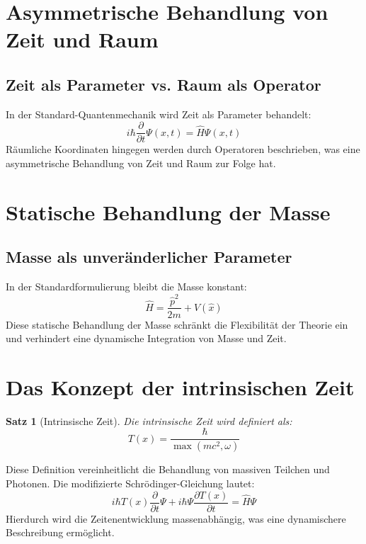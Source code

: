 \documentclass{article}
\newcommand{\Tfield}{T(x)}
\newtheorem{theorem}{Satz}[section]
\begin{document}
	\section{Asymmetrische Behandlung von Zeit und Raum}
	\subsection{Zeit als Parameter vs. Raum als Operator}
	In der Standard-Quantenmechanik wird Zeit als Parameter behandelt:
	\begin{equation}
		i\hbar \frac{\partial}{\partial t}\Psi(x,t) = \hat{H}\Psi(x,t)
	\end{equation}
	Räumliche Koordinaten hingegen werden durch Operatoren beschrieben, was eine asymmetrische Behandlung von Zeit und Raum zur Folge hat.
	
	\section{Statische Behandlung der Masse}
	\subsection{Masse als unveränderlicher Parameter}
	In der Standardformulierung bleibt die Masse konstant:
	\begin{equation}
		\hat{H} = \frac{\hat{p}^2}{2m} + V(\hat{x})
	\end{equation}
	Diese statische Behandlung der Masse schränkt die Flexibilität der Theorie ein und verhindert eine dynamische Integration von Masse und Zeit.
	
	\section{Das Konzept der intrinsischen Zeit}
	\begin{theorem}[Intrinsische Zeit]
		Die intrinsische Zeit wird definiert als:
		\begin{equation}
			\Tfield = \frac{\hbar}{\max(m c^2, \omega)}
		\end{equation}
	\end{theorem}
	Diese Definition vereinheitlicht die Behandlung von massiven Teilchen und Photonen. Die modifizierte Schrödinger-Gleichung lautet:
	\begin{equation}
		i\hbar \Tfield \frac{\partial}{\partial t} \Psi + i\hbar \Psi \frac{\partial \Tfield}{\partial t} = \hat{H} \Psi
	\end{equation}
	Hierdurch wird die Zeitenentwicklung massenabhängig, was eine dynamischere Beschreibung ermöglicht.
	
\end{document}
